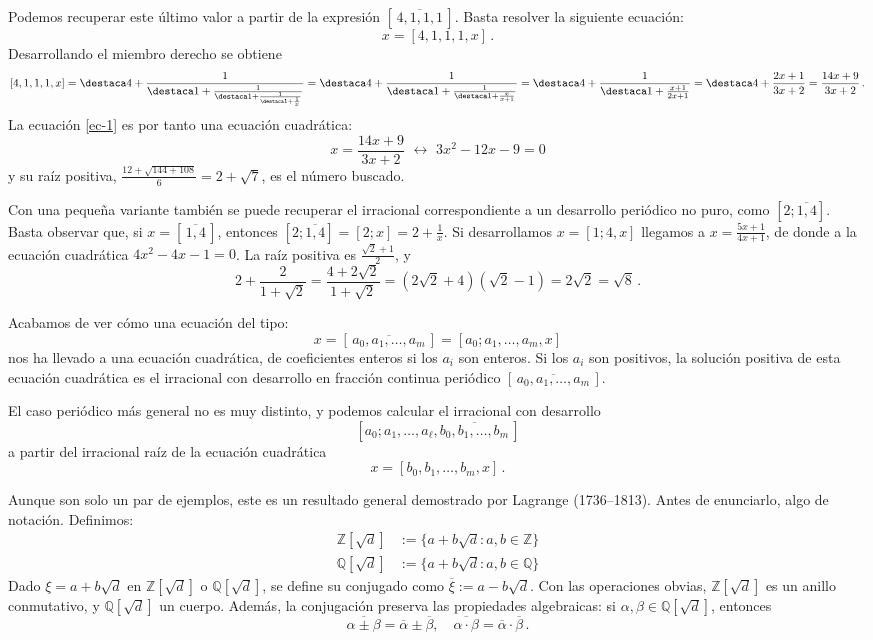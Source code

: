 Podemos recuperar este último valor a partir de la expresión $[\,\overline{4,1,1,1}\,]$. Basta resolver la siguiente ecuación:
\begin{equation}
x=[4,1,1,1,x]\,.\label{ec-1}
\end{equation}
Desarrollando el miembro derecho se obtiene
$$
[4,1,1,1,x]=\destaca4+\frac1{\destaca1+\frac{1}{\destaca1+\frac{1}{\destaca1+\frac1x}}}
=
\destaca4+\frac1{\destaca1+\frac{1}{\destaca1+\frac{x}{x+1}}}
=
\destaca4+\frac1{\destaca1+\frac{x+1}{2x+1}}
=
\destaca4+\frac{2x+1}{3x+2}=\frac{14x+9}{3x+2}\,.
$$
La ecuación \eqref{ec-1} es por tanto una ecuación cuadrática:
$$ x= \frac{14x+9}{3x+2} \,\,\longleftrightarrow\,\,3x^2-12x-9=0$$
y su raíz positiva, $\frac{12+\sqrt{144+108}}6=2+\sqrt7$, es el número buscado.

Con una pequeña variante también se puede recuperar el irracional correspondiente a un desarrollo periódico no puro, como $[2;\overline{1,4}]$. Basta observar que, si $x=[\,\overline{1,4}\,]$, entonces $[2;\overline{1,4}]=[2;x]=2+\frac1x$. Si desarrollamos $x=[1;4,x]$ llegamos a $x=\frac{5x+1}{4x+1}$, de donde a la ecuación cuadrática $4x^2-4x-1=0$. La raíz positiva es $\frac{\sqrt2+1}2$, y 
$$
2+\frac2{1+\sqrt2}=\frac{4+2\sqrt2}{1+\sqrt2}=
(2\sqrt2+4)(\sqrt2-1)=2\sqrt2=\sqrt8\,.
$$

Acabamos de ver cómo una ecuación del tipo:
$$
x=[\,\overline{a_0,a_1,\dots,a_m}\,]=[a_0;a_1,\dots,a_m,x]
$$
nos ha llevado a una ecuación cuadrática, de coeficientes enteros si los $a_i$ son enteros. Si los $a_i$ son positivos, la solución positiva de esta ecuación cuadrática es el irracional con desarrollo en fracción continua periódico $[\,\overline{a_0,a_1,\dots,a_m}\,]$.

El caso periódico más general no es muy distinto, y podemos calcular el irracional con desarrollo 
$$
[a_0;a_1,\dots,a_\ell,\overline{b_0,b_1,\dots,b_m}\,]
$$
a partir del irracional raíz de la ecuación cuadrática
$$x=[b_0,b_1,\dots,b_m,x]\,.$$

Aunque son solo un par de ejemplos, este es un resultado general demostrado por Lagrange (1736--1813). Antes de enunciarlo, algo de notación. Definimos:
\begin{align*}
\mathbb Z[\sqrt d]&:=\big\{a+b\sqrt d: a,b\in\mathbb Z\big\}\\
\mathbb Q[\sqrt d]&:=\big\{a+b\sqrt d: a,b\in\mathbb Q\big\}
\end{align*}
Dado $\xi=a+b\sqrt d$ en $\mathbb Z[\sqrt d]$ o $\mathbb Q[\sqrt d]$, se define su conjugado como $\overline\xi:=a-b\sqrt d$. Con las operaciones obvias, $\mathbb Z[\sqrt d]$ es un anillo conmutativo, y $\mathbb Q[\sqrt d]$ un cuerpo. Además, la conjugación preserva las propiedades algebraicas: si $\alpha,\beta\in\mathbb Q[\sqrt d]$, entonces
$$
\overline{\alpha\pm\beta}=\overline\alpha\pm\overline\beta,\quad
\overline{\alpha\cdot\beta}=\overline\alpha\cdot\overline\beta\,.
$$

